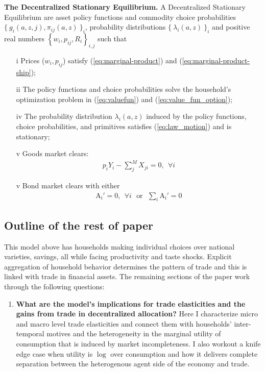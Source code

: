 \documentclass[12pt,pdftex]{article}
\begin{document}
\begin{onehalfspacing}
\textbf{The Decentralized Stationary Equilibrium.} A Decentralized Stationary Equilibrium are asset policy functions and commodity choice probabilities $\{\  g_{i}(a, z, j), \pi_{ij}(a, z) \ \}_{i}$, probability distributions $\{ \ \lambda_i(a, z) \ \}_{i}$ and positive real numbers $\left \{w_i, p_{ij}, R_i\right \}_{i,j}$ such that
\begin{itemize}
\vspace{-.4cm}
\item[i]  Prices ($w_i, p_{ij}$) satisfy (\ref{eq:marginal-product}) and (\ref{eq:marginal-product-ship});
\item[ii] The policy functions and choice probabilities solve the household's optimization problem in (\ref{eq:valuefun}) and (\ref{eq:value_fun_option});
\item[iv] The probability distribution $\lambda_i(a, z)$ induced by the policy functions, choice probabilities, and primitives satisfies (\ref{eq:law_motion}) and is stationary;
\item[v] Goods market clears:
\begin{align}
p_{i} Y_{i} - \sum_{j}^{M}  X_{ji} = 0, \ \ \forall i
\end{align}
\item[v] Bond market clears with either
\begin{align}
\mathrm{A_i'} = 0, \ \ \forall i \ \ \ \mbox{or} \ \ \ \sum_{i}\mathrm{A_i'} = 0
\label{eq:fa-condition}
\end{align}
\end{itemize}

\subsection{Outline of the rest of paper}

This model above has households making individual choices over national varieties, savings, all while facing productivity and taste shocks. Explicit aggregation of household behavior determines the pattern of trade and this is linked with trade in financial assets.  The remaining sections of the paper work through the following questions:
\begin{enumerate}
\item \textbf{What are the model's implications for trade elasticities and the gains from trade in decentralized allocation?} Here I characterize micro and macro level trade elasticities and connect them with households' inter-temporal motives and the heterogeneity in the marginal utility of consumption that is induced by market incompleteness. I also workout a knife edge case when utility is $\log$ over consumption and how it delivers complete separation between the heterogenous agent side of the economy and trade.


\end{enumerate}
\end{onehalfspacing}
\end{document}
